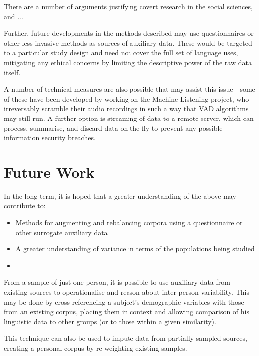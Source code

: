 There are a number of arguments justifying covert research in the social sciences, and ...


Further, future developments in the methods described may use questionnaires or other less-invasive methods as sources of auxiliary data.  These would be targeted to a particular study design and need not cover the full set of language uses, mitigating any ethical concerns by limiting the descriptive power of the raw data itself.

A number of technical measures are also possible that may assist this issue---some of these have been developed by  working on the Machine Listening project, who irreversably scramble their audio recordings in such a way that VAD algorithms may still run.  A further option is streaming of data to a remote server, which can process, summarise, and discard data on-the-fly to prevent any possible information security breaches.











\section{Future Work}

In the long term, it is hoped that a greater understanding of the above may contribute to:

\begin{itemize}
    \item Methods for augmenting and rebalancing corpora using a questionnaire or other surrogate auxiliary data
    \item A greater understanding of variance in terms of the populations being studied
    \item 
\end{itemize}

From a sample of just one person, it is possible to use auxiliary data from existing sources to operationalise and reason about inter-person variability.  This may be done by cross-referencing a subject's demographic variables with those from an existing corpus, placing them in context and allowing comparison of his linguistic data to other groups (or to those within a given similarity).

This technique can also be used to impute data from partially-sampled sources, creating a personal corpus by re-weighting existing samples.

